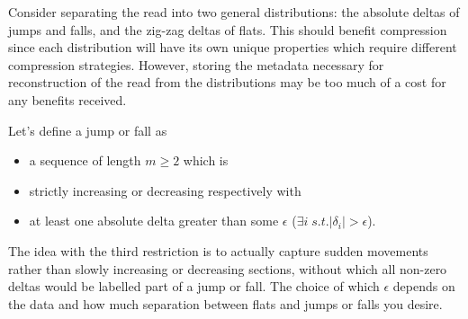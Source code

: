 Consider separating the read into two general distributions: the absolute deltas
of jumps and falls, and the zig-zag deltas of flats. This should benefit
compression since each distribution will have its own unique properties which
require different compression strategies. However, storing the metadata
necessary for reconstruction of the read from the distributions may be too much
of a cost for any benefits received.

Let's define a jump or fall as
\begin{itemize}
	\item a sequence of length $m\ge 2$ which is
	\item strictly increasing or decreasing respectively with
	\item at least one absolute delta greater than some $\epsilon$ ($\exists i\; s.t.|\delta_i|>\epsilon$).
\end{itemize}

The idea with the third restriction is to actually capture sudden movements
rather than slowly increasing or decreasing sections, without which all non-zero
deltas would be labelled part of a jump or fall. The choice of which $\epsilon$
depends on the data and how much separation between flats and jumps or falls you
desire.


